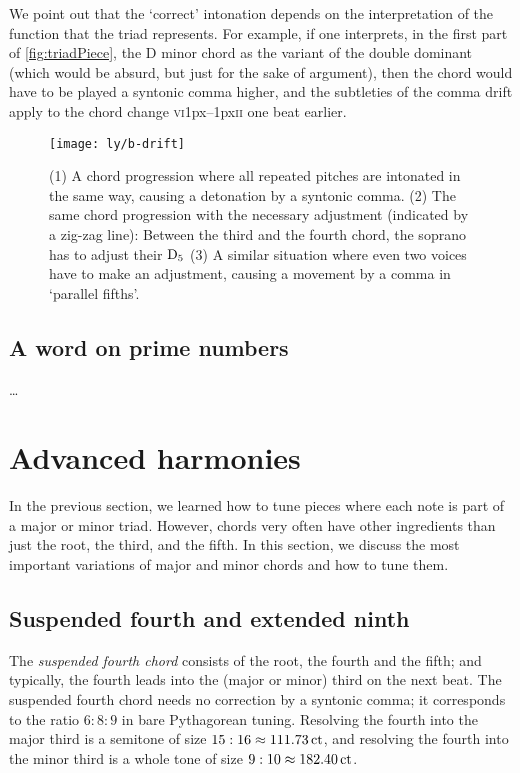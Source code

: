 \documentclass[british,11pt]{scrartcl}
\begin{document}
We point out that the ‘correct’ intonation depends on the interpretation of the
function that the triad represents.  For example, if one interprets, in the
first part of \cref{fig:triadPiece}, the D minor chord as the variant of the
double dominant (which would be absurd, but just for the sake of argument), then
the chord would have to be played a syntonic comma higher, and the subtleties of
the comma drift apply to the chord change
\textsc{vi}\kern1px–\kern1px\textsc{ii} one beat earlier.

\begin{figure}
  \centering
  \texttt{[image: ly/b-drift]}
  \caption{(1) A chord progression where all repeated pitches are intonated in
    the same way, causing a detonation by a syntonic comma.%
    \quad(2) The same chord progression with the necessary adjustment (indicated
    by a zig-zag line): Between the third and the fourth chord, the soprano has
    to adjust their $\text{D}_5$%
    \quad(3) A similar situation where even two voices have to make an
    adjustment, causing a movement by a comma in ‘parallel
    fifths’.}\label{fig:drift}
\end{figure}

\subsection{A word on prime numbers}

…

\section{Advanced harmonies}

In the previous section, we learned how to tune pieces where each note is part
of a major or minor triad.  However, chords very often have other ingredients
than just the root, the third, and the fifth.  In this section, we discuss the
most important variations of major and minor chords and how to tune them.

\subsection{Suspended fourth and extended ninth}

The \emph{suspended fourth chord} consists of the root, the fourth and the
fifth; and typically, the fourth leads into the (major or minor) third on the
next beat.  The suspended fourth chord needs no correction by a syntonic comma;
it corresponds to the ratio $6:8:9$ in bare Pythagorean tuning.  Resolving the
fourth into the major third is a semitone of size
$15:16\approx 111.73\,\mathrm{ct}$, and resolving the fourth into the minor third is
a whole tone of size $9:10\approx 182.40\,\mathrm{ct}$.
\end{document}
